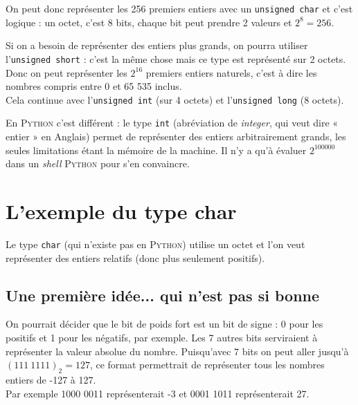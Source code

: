 On peut donc représenter les 256 premiers entiers avec un \texttt{unsigned char} et c'est logique : un octet, c'est 8 bits, chaque bit peut prendre 2
valeurs et $2^8=256$.

Si on a besoin de représenter des entiers plus grands, on pourra utiliser l'\texttt{unsigned short} : c'est la même chose mais ce type est représenté
sur 2 octets. Donc on peut représenter les $2^{16}$ premiers entiers naturels, c'est à dire les nombres compris entre 0 et 65 535 inclus.\\

Cela continue avec l'\texttt{unsigned int} (sur 4 octets) et l'\texttt{unsigned long} (8 octets).


\begin{remarque}[]
    En  \textsc{Python} c'est différent : le type \texttt{int} (abréviation de \textit{integer}, qui veut dire « entier »  en Anglais) permet de
    représenter des entiers arbitrairement grands, les seules limitations
    étant la mémoire de la machine. Il n'y a qu'à évaluer $2^{100000}$  dans un \textit{shell} \textsc{Python} pour s'en convaincre.
\end{remarque}



\section{L'exemple du type char}

Le type \texttt{char} (qui n'existe pas en \textsc{Python}) utilise un octet et l'on veut représenter des
entiers relatifs (donc plus seulement positifs).

\subsection{Une première idée... qui n'est pas si bonne}

On pourrait décider que le bit de poids fort est un bit de signe : 0 pour les positifs et 1 pour les négatifs, par
exemple. Les 7 autres bits serviraient à représenter la valeur absolue du nombre. Puisqu'avec 7 bits on peut aller
jusqu'à $(111\ 1111)_2=127$, ce format permettrait de représenter tous les nombres entiers de -127 à 127.\\

Par exemple 1000 0011 représenterait -3 et 0001 1011 représenterait 27.\\

